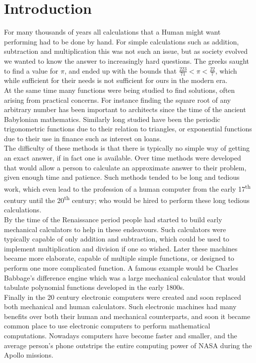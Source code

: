 \section{Introduction}
\label{SEC_"Introduction"}
For many thousands of years all calculations that a Human might want performing had to be done by hand. For simple calculations such as addition, subtraction and multiplication this was not such an issue, but as society evolved we wanted to know the answer to increasingly hard questions. The greeks saught to find a value for $\pi$, and ended up with the bounds that $\frac{223}{71} < \pi < \frac{22}{7}$, which while sufficient for their needs is not sufficient for ours in the modern era. \\

At the same time many functions were being studied to find solutions, often arising from practical concerns. For instance finding the square root of any arbitrary number has been important to architects since the time of the ancient Babylonian mathematics. Similarly long studied have been the periodic trigonometric functions due to their relation to triangles, or exponential functions due to their use in finance such as interest on loans.\\

The difficulty of these methods is that there is typically no simple way of getting an exact answer, if in fact one is available. Over time methods were developed that would allow a person to calculate an approximate answer to their problem, given enough time and patience. Such methods tended to be long and tedious work, which even lead to the profession of a human computer from the early 17\textsuperscript{th} century until the 20\textsuperscript{th} century; who would be hired to perform these long tedious calculations.\\

By the time of the Renaissance period people had started to build early mechanical calculators to help in these endeavours. Such calculators were typically capable of only addition and subtraction, which could be used to implement multiplication and division if one so wished. Later these machines became more elaborate, capable of multiple simple functions, or designed to perform one more complicated function. A famous example would be Charles Babbage's difference engine which was a large mechanical calculator that would tabulate polynomial functions developed in the early 1800s.\\

Finally in the 20 century electronic computers were created and soon replaced both mechanical and human calculators. Such electronic machines had many benefits over both their human and mechanical counterparts, and soon it became common place to use electronic computers to perform mathematical computations. Nowadays computers have become faster and smaller, and the average person's phone outstrips the entire computing power of NASA during the Apollo missions.\\


